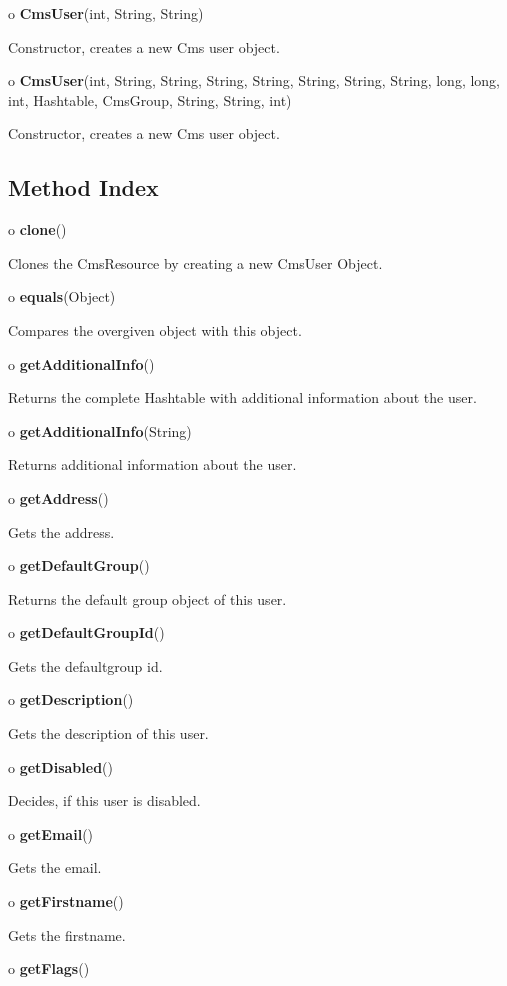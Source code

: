 \begin{description}
\item o {\bf CmsUser}(int, String, String)  

Constructor, creates a new Cms user object.  
\item o {\bf CmsUser}(int, String, String, String, String, String, String,
String, long, long, int, Hashtable, CmsGroup, String, String, int)  

Constructor, creates a new Cms user object. 
\end{description}

\subsection*{  Method Index }

\begin{description}
\item o {\bf clone}()  

Clones the CmsResource by creating a new CmsUser Object.  
\item o {\bf equals}(Object)  

Compares the overgiven object with this object.  
\item o {\bf getAdditionalInfo}()  

Returns the complete Hashtable with additional information about the user.  
\item o {\bf getAdditionalInfo}(String)  

Returns additional information about the user.  
\item o {\bf getAddress}()  

Gets the address.  
\item o {\bf getDefaultGroup}()  

Returns the default group object of this user.  
\item o {\bf getDefaultGroupId}()  

Gets the defaultgroup id.  
\item o {\bf getDescription}()  

Gets the description of this user.  
\item o {\bf getDisabled}()  

Decides, if this user is disabled.  
\item o {\bf getEmail}()  

Gets the email.  
\item o {\bf getFirstname}()  

Gets the firstname.  
\item o {\bf getFlags}()  


\end{description}
